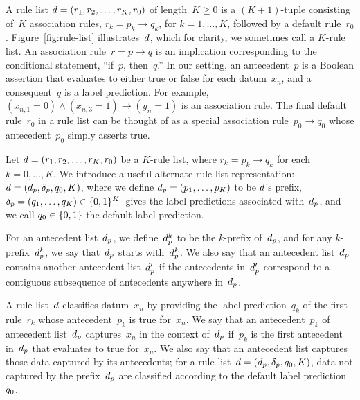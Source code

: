 A rule list ${{d} = (r_1, r_2, \dots, r_K, r_0)}$ of length~${K \ge 0}$
is a ${(K+1)}$-tuple consisting of~$K$ association rules,
${r_k = p_k \rightarrow q_k}$, for ${k = 1, \dots, K}$,
followed by a default rule~$r_0$.
%
Figure~\ref{fig:rule-list} illustrates~${d}$,
which for clarity, we sometimes call a $K$-rule list.
%
An association rule~${r = p \rightarrow q}$ is an implication
corresponding to the conditional statement, ``if~$p$, then~$q$.''
%
In our setting, an antecedent~$p$ is a Boolean assertion that
evaluates to either true or false for each datum~$x_n$,
and a consequent~$q$ is a label prediction.
%
For example, ${(x_{n, 1} = 0) \wedge (x_{n, 3} = 1) \rightarrow (y_n = 1)}$
is an association rule.
%
%
The final default rule~$r_0$ in a rule list can be thought of
as a special association rule~${p_0 \rightarrow q_0}$
whose antecedent~$p_0$ simply asserts true.

Let ${{d} = (r_1, r_2, \dots, r_K, r_0)}$ be a $K$-rule list,
where ${r_k = p_k \rightarrow q_k}$ for each ${k = 0, \dots, K}$.
%
We introduce a useful alternate rule list representation:
${{d} = (d_p, \delta_p, q_0, K)}$,
where we define ${d_p = (p_1, \dots, p_K)}$ to be ${d}$'s prefix,
${\delta_p = (q_1, \dots, q_K) \in \{0, 1\}^K}$~gives
the label predictions associated with~$d_p$,
and we call ${q_0 \in \{0, 1\}}$ the default label prediction.

For an antecedent list~$d_p$, we define~$d_p^k$
to be the $k$-prefix of~$d_p$, and for any $k$-prefix~$d_p^k$,
we say that~$d_p$ starts with~$d_p^k$.
%
We also say that an antecedent list~$d_p$ contains another
antecedent list~$d_p'$ if the antecedents in~$d_p'$ correspond to
a contiguous subsequence of antecedents anywhere in~$d_p$.

A rule list~${d}$ classifies datum~$x_n$ by providing the label prediction~$q_k$
of the first rule~$r_k$ whose antecedent~$p_k$ is true for~$x_n$.
%
We say that an antecedent~$p_k$ of antecedent list~$d_p$ captures~$x_n$
in the context of~$d_p$ if~$p_k$ is the first antecedent in~$d_p$ that
evaluates to true for~$x_n$.
%
We also say that an antecedent list captures those data captured by its antecedents;
for a rule list~${{d} = (d_p, \delta_p, q_0, K)}$,
data not captured by the prefix~$d_p$
are classified according to the default label prediction~$q_0$.

